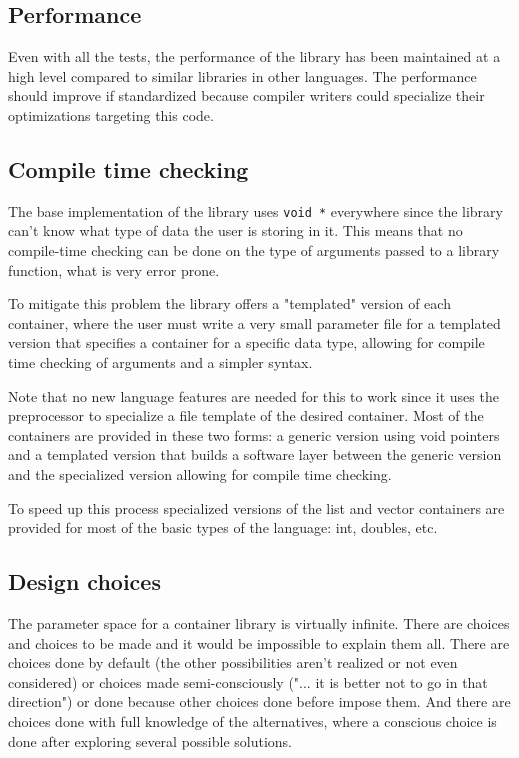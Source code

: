 \subsection{Performance} Even with all the tests, the performance of the library has been maintained at a high level compared to similar libraries
in other languages. The performance should improve if standardized because compiler writers could specialize their optimizations targeting this
code.
\subsection{Compile time checking}
The base implementation of the library uses \verb,void *, everywhere since the library can't know what type
of data the user is storing in it. This means that no compile-time checking can be done on the type of
arguments passed to a library function, what is very error prone.

To mitigate this problem the library offers a "templated" version of each container, where the user must
write a very small parameter file for a templated version that specifies a container for a specific data
type, allowing for compile time checking of arguments and a simpler syntax.

Note that no new language features are needed for this to work since it uses the preprocessor to specialize
a file template of the desired container. Most of the containers are provided in these two forms: a generic
version using void pointers and a templated version that builds a software layer between the generic version and
the specialized version allowing for compile time checking.

To speed up this process specialized versions of the list and vector containers are provided for most of the
basic types of the language: int, doubles, etc.
\subsection{Design choices}
The parameter space for a container library is virtually infinite. There are choices and choices to be made and it would be
impossible to explain them all. There are choices done by default (the other possibilities aren't realized or not even considered)
or choices made semi-consciously ("... it is better not to go in that direction") or done because
other choices done before impose them. And there are choices done with full knowledge of the alternatives,
where a conscious choice is done after exploring several possible solutions.

